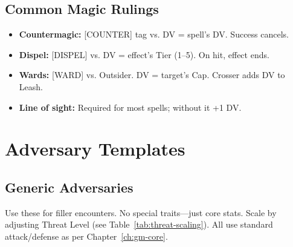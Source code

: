 \subsection*{Common Magic Rulings}
\begin{itemize}
  \item \textbf{Countermagic:} [COUNTER] tag vs. DV = spell's DV. Success cancels.
  \item \textbf{Dispel:} [DISPEL] vs. DV = effect's Tier (1--5). On hit, effect ends.
  \item \textbf{Wards:} [WARD] vs. Outsider. DV = target's Cap. Crosser adds DV to Leash.
  \item \textbf{Line of sight:} Required for most spells; without it +1 DV.
\end{itemize}

\section{Adversary Templates}

\subsection{Generic Adversaries}
\label{subsec:generic-adversaries}
Use these for filler encounters. No special traits---just core stats. Scale by adjusting Threat Level (see Table~\ref{tab:threat-scaling}). All use standard attack/defense as per Chapter~\ref{ch:gm-core}.

